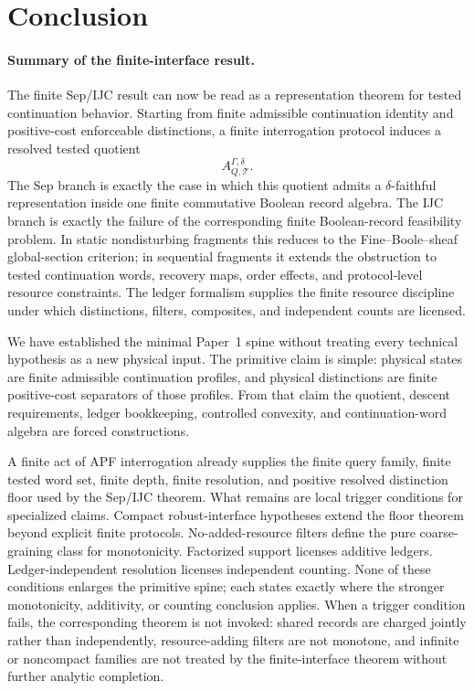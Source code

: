 \documentclass[11pt]{article}
\begin{document}
\section{Conclusion}\label{sec:conclusion}

\paragraph{Summary of the finite-interface result.}
The finite Sep/IJC result can now be read as a representation theorem
for tested continuation behavior.  Starting from finite admissible
continuation identity and positive-cost enforceable distinctions, a
finite interrogation protocol induces a resolved tested quotient
\[
    A^{\Gamma,\delta}_{Q,\mathcal T}.
\]
The Sep branch is exactly the case in which this quotient admits a
$\delta$-faithful representation inside one finite commutative Boolean
record algebra.  The IJC branch is exactly the failure of the
corresponding finite Boolean-record feasibility problem.  In static
nondisturbing fragments this reduces to the Fine--Boole--sheaf
global-section criterion; in sequential fragments it extends the
obstruction to tested continuation words, recovery maps, order effects,
and protocol-level resource constraints.  The ledger formalism
supplies the finite resource discipline under which distinctions,
filters, composites, and independent counts are licensed.

We have established the minimal Paper~1 spine without treating every technical hypothesis as a new physical input. The primitive claim is simple: physical states are finite admissible continuation profiles, and physical distinctions are finite positive-cost separators of those profiles. From that claim the quotient, descent requirements, ledger bookkeeping, controlled convexity, and continuation-word algebra are forced constructions.

A finite act of APF interrogation already supplies the finite query family, finite tested word set, finite depth, finite resolution, and positive resolved distinction floor used by the Sep/IJC theorem. What remains are local trigger conditions for specialized claims. Compact robust-interface hypotheses extend the floor theorem beyond explicit finite protocols. No-added-resource filters define the pure coarse-graining class for monotonicity. Factorized support licenses additive ledgers. Ledger-independent resolution licenses independent counting. None of these conditions enlarges the primitive spine; each states exactly where the stronger monotonicity, additivity, or counting conclusion applies. When a trigger condition fails, the corresponding theorem is not invoked: shared records are charged jointly rather than independently, resource-adding filters are not monotone, and infinite or noncompact families are not treated by the finite-interface theorem without further analytic completion.
\end{document}
